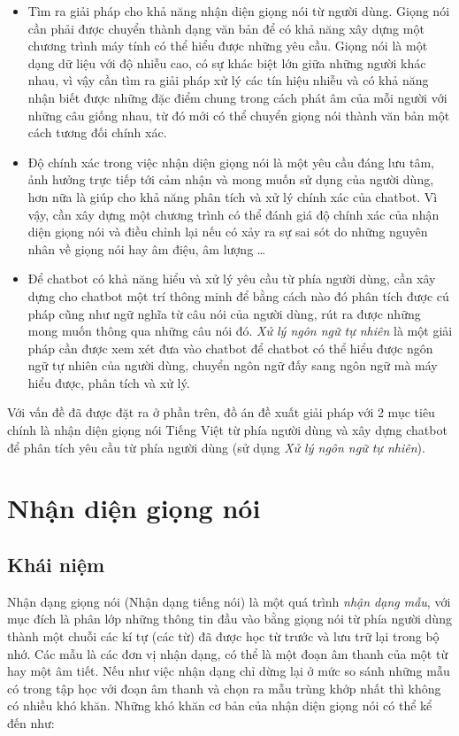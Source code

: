 \documentclass[12pt]{report}
\begin{document}
\begin{itemize}
	\item Tìm ra giải pháp cho khả năng nhận diện giọng nói từ người dùng. Giọng nói cần phải được chuyển thành dạng văn bản để có khả năng xây dựng một chương trình máy tính có thể hiểu được những yêu cầu. Giọng nói là một dạng dữ liệu với độ nhiễu cao, có sự khác biệt lớn giữa những người khác nhau, vì vậy cần tìm ra giải pháp xử lý các tín hiệu nhiễu và có khả năng nhận biết được những đặc điểm chung trong cách phát âm của mỗi người với những câu giống nhau, từ đó mới có thể chuyển giọng nói thành văn bản một cách tương đối chính xác.
	\item Độ chính xác trong việc nhận diện giọng nói là một yêu cầu đáng lưu tâm, ảnh hưởng trực tiếp tới cảm nhận và mong muốn sử dụng của người dùng, hơn nữa là giúp cho khả năng phân tích và xử lý chính xác của chatbot. Vì vậy, cần xây dựng một chương trình có thể đánh giá độ chính xác của nhận diện giọng nói và điều chỉnh lại nếu có xảy ra sự sai sót do những nguyên nhân về giọng nói hay âm điệu, âm lượng \ldots
	\item Để chatbot có khả năng hiểu và xử lý yêu cầu từ phía người dùng, cần xây dựng cho chatbot một trí thông minh để bằng cách nào đó phân tích được cú pháp cũng như ngữ nghĩa từ câu nói của người dùng, rút ra được những mong muốn thông qua những câu nói đó. \textit{Xử lý ngôn ngữ tự nhiên} là một giải pháp cần được xem xét đưa vào chatbot để chatbot có thể hiểu được ngôn ngữ tự nhiên của người dùng, chuyển ngôn ngữ đấy sang ngôn ngữ mà máy hiểu được, phân tích và xử lý.
\end{itemize}

Với vấn đề đã được đặt ra ở phần trên, đồ án đề xuất giải pháp với 2 mục tiêu chính là nhận diện giọng nói Tiếng Việt từ phía người dùng và xây dựng chatbot để phân tích yêu cầu từ phía người dùng (sử dụng \textit{Xử lý ngôn ngữ tự nhiên}).

\section{Nhận diện giọng nói}
\subsection{Khái niệm}
Nhận dạng giọng nói (Nhận dạng tiếng nói) là một quá trình \textit{nhận dạng mẫu}, với mục đích là phân lớp những thông tin đầu vào bằng giọng nói từ phía người dùng thành một chuỗi các kí tự (các từ) đã được học từ trước và lưu trữ lại trong bộ nhớ. Các mẫu là các đơn vị nhận dạng, có thể là một đoạn âm thanh của một từ hay một âm tiết. Nếu như việc nhận dạng chỉ dừng lại ở mức so sánh những mẫu có trong tập học với đoạn âm thanh và chọn ra mẫu trùng khớp nhất thì không có nhiều khó khăn. Những khó khăn cơ bản của nhận diện giọng nói có thể kể đến như:
\end{document}
